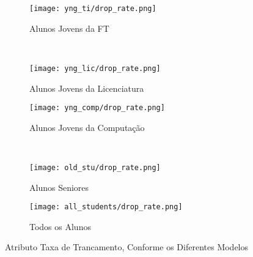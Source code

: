 \clearpage
\begin{figure}[!ht]
    \centering
    \begin{subfigure}[b]{0.48\textwidth}
        \centering
        \texttt{[image: yng\_ti/drop\_rate.png]}
        \caption{Alunos Jovens da FT}
    \end{subfigure}
    ~
    \begin{subfigure}[b]{0.48\textwidth}
        \centering
        \texttt{[image: yng\_lic/drop\_rate.png]}
        \caption{Alunos Jovens da Licenciatura}
    \end{subfigure}

    \begin{subfigure}[b]{0.48\textwidth}
        \centering
        \texttt{[image: yng\_comp/drop\_rate.png]}
        \caption{Alunos Jovens da Computação}
    \end{subfigure}
    ~
    \begin{subfigure}[b]{0.48\textwidth}
        \centering
        \texttt{[image: old\_stu/drop\_rate.png]}
        \caption{Alunos Seniores}
    \end{subfigure}

    \begin{subfigure}[b]{0.48\textwidth}
        \centering
        \texttt{[image: all\_students/drop\_rate.png]}
        \caption{Todos os Alunos}
    \end{subfigure}
    \caption{Atributo Taxa de Trancamento, Conforme os Diferentes Modelos}
\end{figure}

